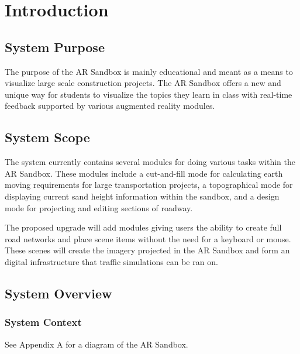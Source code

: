 \documentclass[letterpaper, 10pt, onecolumn, draftclsnofoot]{IEEEtran}
\begin{document}
\section{\textbf{Introduction}}
    \subsection{\textbf{System Purpose}}
        The purpose of the AR Sandbox is mainly educational and meant as a means to visualize large scale construction projects. The AR Sandbox offers a new and unique way for students to visualize the topics they learn in class with real-time feedback supported by various augmented reality modules.
    
    \subsection{\textbf{System Scope}}
        The system currently contains several modules for doing various tasks within the AR Sandbox. These modules include a cut-and-fill mode for calculating earth moving requirements for large transportation projects, a topographical mode for displaying current sand height information within the sandbox, and a design mode for projecting and editing sections of roadway.
        
        The proposed upgrade will add modules giving users the ability to create full road networks and place scene items without the need for a keyboard or mouse. These scenes will create the imagery projected in the AR Sandbox and form an digital infrastructure that traffic simulations can be ran on.
    
    \subsection{\textbf{System Overview}}
        \subsubsection{\textbf{System Context}}
        See Appendix A for a diagram of the AR Sandbox. 
        
\end{document}
